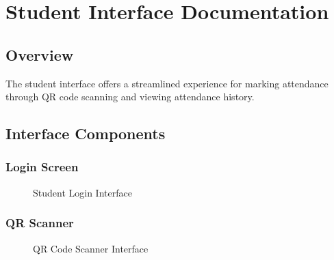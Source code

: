 \section{Student Interface Documentation}
\label{sec:student_interface}
\subsection{Overview}
The student interface offers a streamlined experience for marking attendance through QR code scanning and viewing attendance history.

\subsection{Interface Components}
\subsubsection{Login Screen}
\begin{figure}[H]
    \centering
    \caption{Student Login Interface}
    \label{fig:student_login}
\end{figure}

\subsubsection{QR Scanner}
\begin{figure}[H]
    \centering
    \caption{QR Code Scanner Interface}
    \label{fig:qr_scanner}
\end{figure}

